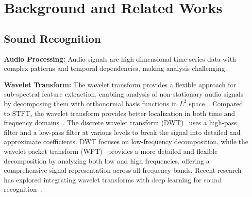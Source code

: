 \section{Background and Related Works}
\label{sec:background-and-related-works}


\subsection{Sound Recognition}
\label{sec:sound-recognition}
\noindent
\textbf{Audio Processing:} Audio signals are high-dimensional time-series data with complex patterns and temporal dependencies, making analysis challenging. 

\noindent
\textbf{Wavelet Transform:}
The wavelet transform provides a flexible approach for sub-spectral feature extraction, enabling analysis of non-stationary audio signals by decomposing them with orthonormal basis functions in $L^2$ space~\cite{kronland1987analysis, daubechies1990wavelet, lambrou1998classification}. Compared to STFT, the wavelet transform provides better localization in both time and frequency domains~\cite{ahn2024split, monjur2023soundsieve}. The discrete wavelet transform (DWT)~\cite{shensa1992discrete} uses a high-pass filter and a low-pass filter at various levels to break the signal into detailed and approximate coefficients.
DWT focuses on low-frequency decomposition, while the wavelet packet transform (WPT)~\cite{laine1993texture} provides a more detailed and flexible decomposition by analyzing both low and high frequencies, offering a comprehensive signal representation across all frequency bands. Recent research has explored integrating wavelet transforms with deep learning for sound recognition~\cite{wu2020time, qian2017wavelets, nakamura2020time, frusque2022learnable}. 


